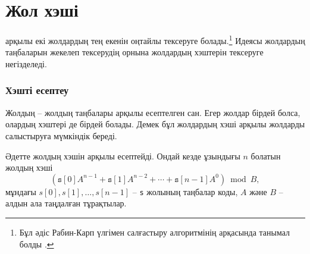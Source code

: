 \section{Жол хэші}


 арқылы екі жолдардың
тең екенін оңтайлы тексеруге болады.\footnote{Бұл әдіс Рабин-Карп үлгімен
салғастыру алгоритмінің арқасында танымал болды \cite{kar87}.} 
Идеясы жолдардың таңбаларын жекелеп тексерудің орнына
жолдардың хэштерін тексеруге негізделеді. 


\subsubsection*{Хэшті есептеу}


Жолдың  -- жолдың таңбалары арқылы 
есептелген сан. Егер жолдар бірдей болса,
олардың хэштері де бірдей болады. Демек 
бұл жолдардың хэші арқылы
жолдарды салыстыруға мүмкіндік береді.


Әдетте жолдың хэшін  арқылы
есептейді. Ондай кезде ұзындығы $n$ болатын 
жолдың хэші 
\[(\texttt{s}[0] A^{n-1} + \texttt{s}[1] A^{n-2} + \cdots + \texttt{s}[n-1] A^0) \bmod B  ,\]
мұндағы $s[0],s[1],\ldots,s[n-1]$ -- \texttt{s} жолының таңбалар коды, %
$A$ және $B$ -- алдын ала таңдалған тұрақтылар. 


